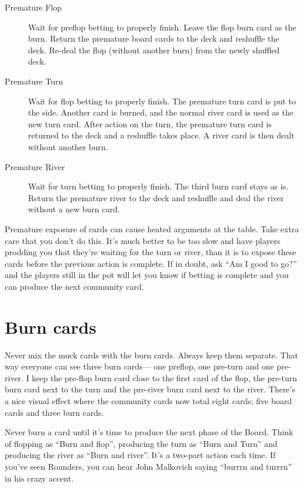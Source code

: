\begin{description}

\item[Premature Flop] Wait for preflop betting to properly finish.
Leave the flop burn card as the burn. Return the premature board
cards to the deck and reshuffle the deck. Re-deal the flop
(without another burn) from the newly shuffled deck.

\item[Premature Turn]  Wait for flop betting to properly finish.
The premature turn card is put to the side.
Another card is burned, and the normal river card is used as the new turn card.
After action on the turn, the premature turn card is returned to the deck
and a reshuffle takes place. A river card is then dealt without another
burn.

\item[Premature River] Wait for turn betting to properly finish.
The third burn card stays as is. Return the premature river to the
deck and reshuffle and deal the river without a new burn card.

\end{description}

Premature exposure of cards can cause heated arguments at the table.
Take extra care that you don't do this. It's much better to be too slow
and have players prodding you that they're waiting for the turn or
river, than it is to expose these cards before the previous action
is complete. If in doubt, ask ``Am I good to go?'' and the players still
in the pot will let you know if betting is complete and you can
produce the next community card.

\section{Burn cards}

Never mix the muck cards with the burn cards. Always keep them
separate. That way everyone can see three burn cards--- one preflop,
one pre-turn and one pre-river. I keep the pre-flop burn card close to
the first card of the flop, the pre-turn burn card next to the turn and
the pre-river burn card next to the river. There's a nice visual effect
where the community cards now total eight cards; five board cards and
three burn cards.


Never burn a card until it's time to produce the next phase
of the Board. Think of flopping as ``Burn and flop'', producing the
turn as ``Burn and Turn'' and producing the river as ``Burn and river''.
It's a two-part action each time. If you've seen Rounders, you can
hear John Malkovich saying ``burrrn and turrrn'' in his crazy accent.

